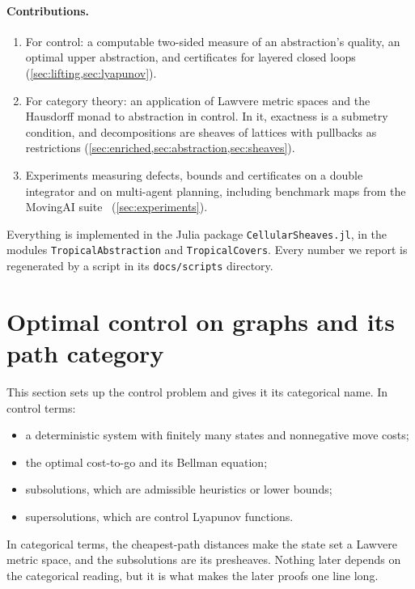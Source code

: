 \documentclass[11pt]{article}
\theoremstyle{definition}
\theoremstyle{remark}
\begin{document}
\paragraph{Contributions.}
\begin{enumerate}[nosep]
\item For control: a computable two-sided measure of an abstraction's quality, an
  optimal upper abstraction, and certificates for layered closed loops
  (\cref{sec:lifting,sec:lyapunov}).
\item For category theory: an application of Lawvere metric spaces and the
  Hausdorff monad to abstraction in control. In it, exactness is a submetry
  condition, and decompositions are sheaves of lattices with pullbacks as
  restrictions (\cref{sec:enriched,sec:abstraction,sec:sheaves}).
\item Experiments measuring defects, bounds and certificates on a double integrator
  and on multi-agent planning, including benchmark maps from the MovingAI
  suite~\cite{sturtevant2012,stern2019} (\cref{sec:experiments}).
\end{enumerate}
Everything is implemented in the Julia package \texttt{CellularSheaves.jl}, in
the modules \texttt{Tropical\-Abstraction} and \texttt{Tropical\-Covers}. Every number
we report is regenerated by a script in its \texttt{docs/scripts} directory.

\section{Optimal control on graphs and its path category}\label{sec:enriched}

This section sets up the control problem and gives it its categorical name. In
control terms:
\begin{itemize}[nosep]
\item a deterministic system with finitely many states and nonnegative move costs;
\item the optimal cost-to-go and its Bellman equation;
\item subsolutions, which are admissible heuristics or lower bounds;
\item supersolutions, which are control Lyapunov functions.
\end{itemize}
In categorical terms, the cheapest-path distances make the state set a Lawvere
metric space, and the subsolutions are its presheaves. Nothing later depends on
the categorical reading, but it is what makes the later proofs one line long.
\end{document}
